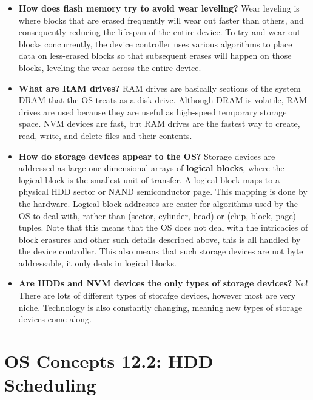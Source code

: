 \documentclass[12pt]{article}
\begin{document}
\begin{itemize}
    \item \textbf{How does flash memory try to avoid wear leveling?} Wear leveling is where blocks that are erased frequently will wear out faster than others, and consequently reducing the lifespan of the entire device. To try and wear out blocks concurrently, the device controller uses various algorithms to place data on less-erased blocks so that subsequent erases will happen on those blocks, leveling the wear across the entire device.
    \item \textbf{What are RAM drives?} RAM drives are basically sections of the system DRAM that the OS treats as a disk drive. Although DRAM is volatile, RAM drives are used because they are useful as high-speed temporary storage space. NVM devices are fast, but RAM drives are the fastest way to create, read, write, and delete files and their contents.
    \item \textbf{How do storage devices appear to the OS?} Storage devices are addressed as large one-dimensional arrays of \textbf{logical blocks}, where the logical block is the smallest unit of transfer. A logical block maps to a physical HDD sector or NAND semiconductor page. This mapping is done by the hardware. Logical block addresses are easier for algorithms used by the OS to deal with, rather than (sector, cylinder, head) or (chip, block, page) tuples. Note that this means that the OS does not deal with the intricacies of block erasures and other such details described above, this is all handled by the device controller. This also means that such storage devices are not byte addressable, it only deals in logical blocks.
    \item \textbf{Are HDDs and NVM devices the only types of storage devices?} No! There are lots of different types of storafge devices, however most are very niche. Technology is also constantly changing, meaning new types of storage devices come along.
\end{itemize}

\section*{OS Concepts 12.2: HDD Scheduling}
\end{document}
